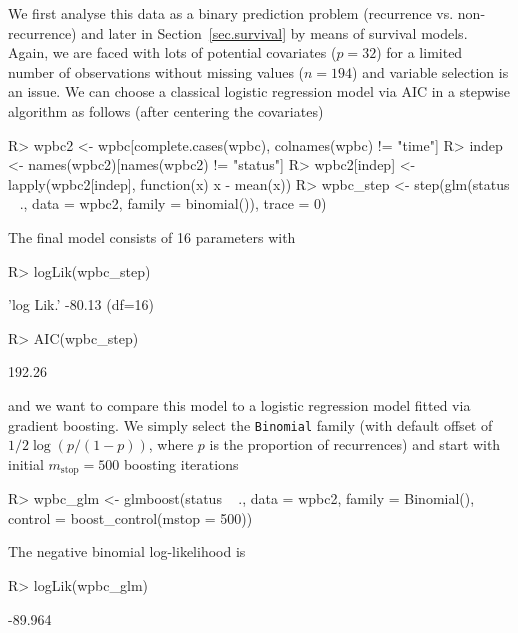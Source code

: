\documentclass{article}
\newcommand{\Robject}[1]{\texttt{#1}}
\newenvironment{Schunk}{}{}
\begin{document}
We first analyse this data as a binary prediction problem 
(recurrence vs. non-recurrence) and later in Section~\ref{sec.survival} 
by means of survival models. Again, we are faced with lots of potential covariates ($p = 32$) 
for a limited number of observations without missing values 
($n = 194$) and variable selection is an issue. We can choose a classical logistic regression model 
via AIC in a stepwise algorithm as follows (after centering the covariates)
\begin{Schunk}
\begin{Sinput}
R> wpbc2 <- wpbc[complete.cases(wpbc), colnames(wpbc) != 
         "time"]
R> indep <- names(wpbc2)[names(wpbc2) != "status"]
R> wpbc2[indep] <- lapply(wpbc2[indep], function(x) x - 
         mean(x))
R> wpbc_step <- step(glm(status ~ ., data = wpbc2, 
         family = binomial()), trace = 0)
\end{Sinput}
\end{Schunk}
The final model consists of 16 parameters with
\begin{Schunk}
\begin{Sinput}
R> logLik(wpbc_step)
\end{Sinput}
\begin{Soutput}
'log Lik.' -80.13 (df=16)
\end{Soutput}
\begin{Sinput}
R> AIC(wpbc_step)
\end{Sinput}
\begin{Soutput}
[1] 192.26
\end{Soutput}
\end{Schunk}
and we want to compare this model to a logistic regression model fitted via gradient boosting. 
We simply select the \Robject{Binomial} family (with default offset of $1/2 \log(p / (1 - p))$, 
where $p$ is the proportion of recurrences) and start with initial 
$m_\text{stop} = 500$ boosting iterations
\begin{Schunk}
\begin{Sinput}
R> wpbc_glm <- glmboost(status ~ ., data = wpbc2, 
         family = Binomial(), control = boost_control(mstop = 500))
\end{Sinput}
\end{Schunk}
The negative binomial log-likelihood is
\begin{Schunk}
\begin{Sinput}
R> logLik(wpbc_glm)
\end{Sinput}
\begin{Soutput}
[1] -89.964
\end{Soutput}
\end{Schunk}
\end{document}
